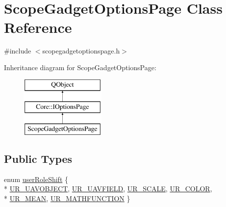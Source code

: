 \hypertarget{class_scope_gadget_options_page}{\section{Scope\-Gadget\-Options\-Page Class Reference}
\label{class_scope_gadget_options_page}
}


{\ttfamily \#include $<$scopegadgetoptionspage.\-h$>$}

Inheritance diagram for Scope\-Gadget\-Options\-Page\-:\begin{figure}[H]
\begin{center}
\leavevmode
\includegraphics[height=3.000000cm]{class_scope_gadget_options_page}
\end{center}
\end{figure}
\subsection*{Public Types}
\begin{DoxyCompactItemize}
\item 
enum \hyperlink{group___scope_plugin_gabc55f54668fc1565f24893b44bc2affe}{user\-Role\-Shift} \{ \\*
\hyperlink{group___scope_plugin_ggabc55f54668fc1565f24893b44bc2affea1ca47671f95b0080d7fec89b625ecdae}{U\-R\-\_\-\-U\-A\-V\-O\-B\-J\-E\-C\-T}, 
\hyperlink{group___scope_plugin_ggabc55f54668fc1565f24893b44bc2affea9d7b3ed8977c973cd47ec9c590888e83}{U\-R\-\_\-\-U\-A\-V\-F\-I\-E\-L\-D}, 
\hyperlink{group___scope_plugin_ggabc55f54668fc1565f24893b44bc2affeacf5de4c7658c11db0a432311ce7e302e}{U\-R\-\_\-\-S\-C\-A\-L\-E}, 
\hyperlink{group___scope_plugin_ggabc55f54668fc1565f24893b44bc2affea9314bed2c7220cb80e1c7e1c643e7af8}{U\-R\-\_\-\-C\-O\-L\-O\-R}, 
\\*
\hyperlink{group___scope_plugin_ggabc55f54668fc1565f24893b44bc2affea43e3a9f89e27568aa426874ed469620a}{U\-R\-\_\-\-M\-E\-A\-N}, 
\hyperlink{group___scope_plugin_ggabc55f54668fc1565f24893b44bc2affeab9a9633c8bc6a72c30f2a2962ff1e882}{U\-R\-\_\-\-M\-A\-T\-H\-F\-U\-N\-C\-T\-I\-O\-N}
 \}
\end{DoxyCompactItemize}
